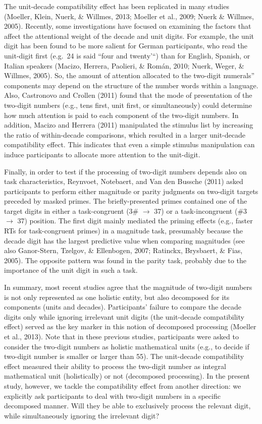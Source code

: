 \documentclass[english,man]{apa6}
\theoremstyle{definition}
\theoremstyle{definition}
\theoremstyle{definition}
\theoremstyle{remark}
\begin{document}
The unit-decade compatibility effect has been replicated in many studies
(Moeller, Klein, Nuerk, \& Willmes, 2013; Moeller et al., 2009; Nuerk \&
Willmes, 2005). Recently, some investigations have focused on examining
the factors that affect the attentional weight of the decade and unit
digits. For example, the unit digit has been found to be more salient
for German participants, who read the unit-digit first (e.g.~24 is said
``four and twenty'\enquote{) than for English, Spanish, or Italian
speakers (Macizo, Herrera, Paolieri, \& Román, 2010; Nuerk, Weger, \&
Willmes, 2005). So, the amount of attention allocated to the two-digit
numerals} components may depend on the structure of the number words
within a language. Also, Castronovo and Crollen (2011) found that the
mode of presentation of the two-digit numbers (e.g., tens first, unit
first, or simultaneously) could determine how much attention is paid to
each component of the two-digit numbers. In addition, Macizo and Herrera
(2011) manipulated the stimulus list by increasing the ratio of
within-decade comparisons, which resulted in a larger unit-decade
compatibility effect. This indicates that even a simple stimulus
manipulation can induce participants to allocate more attention to the
unit-digit.

Finally, in order to test if the processing of two-digit numbers depends
also on task characteristics, Reynvoet, Notebaert, and Van den Bussche
(2011) asked participants to perform either magnitude or parity
judgments on two-digit targets preceded by masked primes. The
briefly-presented primes contained one of the target digits in either a
task-congruent (3\# \(\rightarrow\) 37) or a task-incongruent (\#3
\(\rightarrow\) 37) position. The first digit mainly mediated the
priming effects (e.g., faster RTs for task-congruent primes) in a
magnitude task, presumably because the decade digit has the largest
predictive value when comparing magnitudes (see also Ganor-Stern,
Tzelgov, \& Ellenbogen, 2007; Ratinckx, Brysbaert, \& Fias, 2005). The
opposite pattern was found in the parity task, probably due to the
importance of the unit digit in such a task.

In summary, most recent studies agree that the magnitude of two-digit
numbers is not only represented as one holistic entity, but also
decomposed for its components (units and decades). Participants' failure
to compare the decade digits only while ignoring irrelevant unit digits
(the unit-decade compatibility effect) served as the key marker in this
notion of decomposed processing (Moeller et al., 2013). Note that in
these previous studies, participants were asked to consider the
two-digit numbers as holistic mathematical units (e.g., to decide if
two-digit number is smaller or larger than 55). The unit-decade
compatibility effect measured their ability to process the two-digit
number as integral mathematical unit (holistically) or not (decomposed
processing). In the present study, however, we tackle the compatibility
effect from another direction: we explicitly ask participants to deal
with two-digit numbers in a specific decomposed manner. Will they be
able to exclusively process the relevant digit, while simultaneously
ignoring the irrelevant digit?
\end{document}
